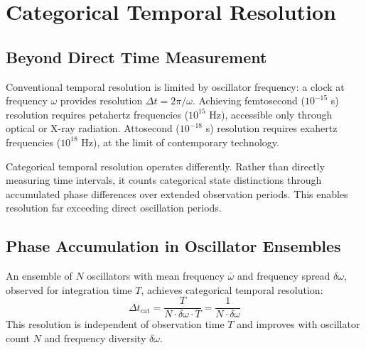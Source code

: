 \section{Categorical Temporal Resolution}
\label{sec:categorical_resolution}

\subsection{Beyond Direct Time Measurement}

Conventional temporal resolution is limited by oscillator frequency: a clock at frequency $\omega$ provides resolution $\Delta t = 2\pi/\omega$. Achieving femtosecond ($10^{-15}$ s) resolution requires petahertz frequencies ($10^{15}$ Hz), accessible only through optical or X-ray radiation. Attosecond ($10^{-18}$ s) resolution requires exahertz frequencies ($10^{18}$ Hz), at the limit of contemporary technology.

Categorical temporal resolution operates differently. Rather than directly measuring time intervals, it counts categorical state distinctions through accumulated phase differences over extended observation periods. This enables resolution far exceeding direct oscillation periods.

\subsection{Phase Accumulation in Oscillator Ensembles}

\begin{theorem}
\label{thm:categorical_resolution}
An ensemble of $N$ oscillators with mean frequency $\bar{\omega}$ and frequency spread $\delta\omega$, observed for integration time $T$, achieves categorical temporal resolution:
\begin{equation}
\Delta t_{\text{cat}} = \frac{T}{N \cdot \delta\omega \cdot T} = \frac{1}{N \cdot \delta\omega}
\end{equation}
This resolution is independent of observation time $T$ and improves with oscillator count $N$ and frequency diversity $\delta\omega$.
\end{theorem}

